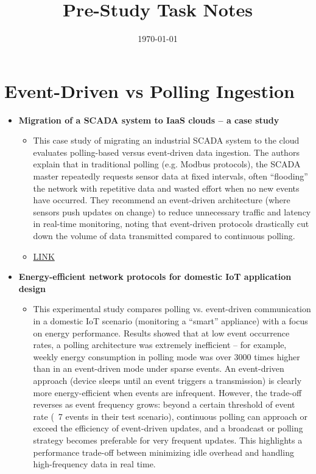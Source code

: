 \documentclass[11pt]{article}
\title{Pre-Study Task Notes}
\date{\today}
\begin{document}
\maketitle

\section*{Event-Driven vs Polling Ingestion}
\begin{itemize}
  \item[] \textbf{Migration of a SCADA system to IaaS clouds – a case study}
  \begin{itemize}
      \item[] This case study of migrating an industrial SCADA system to the cloud evaluates polling-based versus event-driven data ingestion. The authors explain that in traditional polling (e.g. Modbus protocols), the SCADA master repeatedly requests sensor data at fixed intervals, often “flooding” the network with repetitive data and wasted effort when no new events have occurred. They recommend an event-driven architecture (where sensors push updates on change) to reduce unnecessary traffic and latency in real-time monitoring, noting that event-driven protocols drastically cut down the volume of data transmitted compared to continuous polling. 
      \item[] \href{https://link.springer.com/article/10.1186/s13677-017-0080-5}{LINK}
  \end{itemize}
  \item[] \textbf{Energy-efficient network protocols for domestic IoT application design}
  \begin{itemize}
      \item[] This experimental study compares polling vs. event-driven communication in a domestic IoT scenario (monitoring a “smart” appliance) with a focus on energy performance. Results showed that at low event occurrence rates, a polling architecture was extremely inefficient – for example, weekly energy consumption in polling mode was over 3000 times higher than in an event-driven mode under sparse events. An event-driven approach (device sleeps until an event triggers a transmission) is clearly more energy-efficient when events are infrequent. However, the trade-off reverses as event frequency grows: beyond a certain threshold of event rate (~7 events in their test scenario), continuous polling can approach or exceed the efficiency of event-driven updates, and a broadcast or polling strategy becomes preferable for very frequent updates. This highlights a performance trade-off between minimizing idle overhead and handling high-frequency data in real time.

\end{itemize}
\end{itemize}
\end{document}
